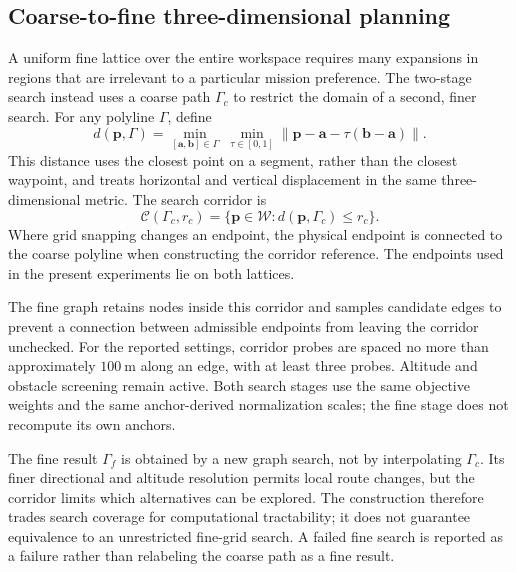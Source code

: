 \subsection{Coarse-to-fine three-dimensional planning}
\label{sec:coarsefine}

A uniform fine lattice over the entire workspace requires many expansions
in regions that are irrelevant to a particular mission preference. The
two-stage search instead uses a coarse path $\Gamma_c$ to restrict the
domain of a second, finer search. For any polyline $\Gamma$, define
\begin{equation}
 d(\mathbf p,\Gamma)=
 \min_{[\mathbf a,\mathbf b]\in\Gamma}\;
 \min_{\tau\in[0,1]}
 \|\mathbf p-\mathbf a-\tau(\mathbf b-\mathbf a)\|.
 \label{me:eq:distance}
\end{equation}
This distance uses the closest point on a segment, rather than the closest
waypoint, and treats horizontal and vertical displacement in the same
three-dimensional metric. The search corridor is
\begin{equation}
 \mathcal C(\Gamma_c,r_c)=
 \{\mathbf p\in\mathcal W:d(\mathbf p,\Gamma_c)\le r_c\}.
 \label{me:eq:corridor}
\end{equation}
Where grid snapping changes an endpoint, the physical endpoint is connected
to the coarse polyline when constructing the corridor reference. The
endpoints used in the present experiments lie on both lattices.

The fine graph retains nodes inside this corridor and samples candidate
edges to prevent a connection between admissible endpoints from leaving
the corridor unchecked. For the reported settings, corridor probes are
spaced no more than approximately $100~\mathrm{m}$ along an edge, with at
least three probes. Altitude and obstacle screening remain active. Both
search stages use the same objective weights and the same anchor-derived
normalization scales; the fine stage does not recompute its own anchors.

The fine result $\Gamma_f$ is obtained by a new graph search, not by
interpolating $\Gamma_c$. Its finer directional and altitude resolution
permits local route changes, but the corridor limits which alternatives
can be explored. The construction therefore trades search coverage for
computational tractability; it does not guarantee equivalence to an
unrestricted fine-grid search. A failed fine search is reported as a
failure rather than relabeling the coarse path as a fine result.


